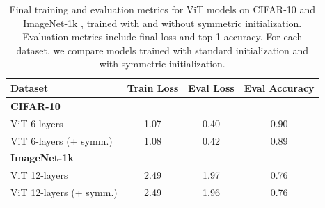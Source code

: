 \begin{table}[t]
\caption{Final training and evaluation metrics for ViT models on CIFAR-10 \citep{krizhevsky2009learning} and ImageNet-1k \citep{deng_imagenet_2009}, trained with and without symmetric initialization.
%
Evaluation metrics include final loss and top-1 accuracy. For each dataset, we compare models trained with standard initialization and with symmetric initialization.
%
}
\label{table:vit-symm-results}
\vskip 0.15in
\begin{center}
\begin{small}
\begin{sc}
\begin{tabular}{lccc}
\toprule
Dataset & Train Loss & Eval Loss & Eval Accuracy \\
\midrule\midrule
\textbf{CIFAR-10} & & & \\
\midrule
ViT 6-layers & 1.07 & 0.40 & {0.90} \\
ViT 6-layers (+ symm.) & {1.08} & {0.42} & 0.89 \\
\midrule
\textbf{ImageNet-1k} & & & \\
\midrule
ViT 12-layers & {2.49} & 1.97 & {0.76} \\
ViT 12-layers (+ symm.) & {2.49} & {1.96} & {0.76} \\
\bottomrule
\end{tabular}
\end{sc}
\end{small}
\end{center}
\vskip -0.1in
\end{table}
